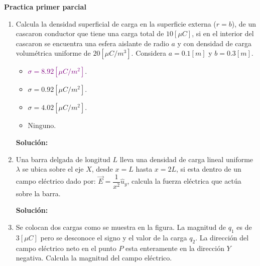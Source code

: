 \documentclass[letter,11pt]{article}
\begin{document}
\begin{center}
    {\Large \bf{Practica primer parcial}}
\end{center}

\noindent{}

\vspace{0.5cm}

\begin{enumerate}
\item Calcula la densidad superficial de carga en la superficie externa ($r=b$),
de un cascaron conductor que tiene una carga total de $10[\mu C]$, si en el
interior del cascaron se encuentra una esfera aislante de radio $a$ y con
densidad de carga volumétrica uniforme de $20[\mu C/m^3]$. Considera $a=0.1[m]$
y $b=0.3[m]$.

\begin{itemize}
    \item \textcolor{purple}{$\sigma = 8.92 [\mu C/m^2]$}.
    \item $\sigma = 0.92 [\mu C/m^2]$.
    \item $\sigma = 4.02 [\mu C/m^2]$.
    \item Ninguno.
\end{itemize}

\textbf{Solución:}


\item Una barra delgada de longitud $L$ lleva una densidad de carga lineal
uniforme $\lambda$ se ubica sobre el eje $X$, desde $x=L$ hasta $x=2L$, si esta
dentro de un campo eléctrico dado por: $\vec{E}=\dfrac{1}{x^2} \hat{u}_y$,
calcula la fuerza eléctrica que actúa sobre la barra.

\textbf{Solución:}

\item Se colocan dos cargas como se muestra en la figura. La magnitud de $q_1$
es de $3[\mu C]$ pero se desconoce el signo y el valor de la carga $q_2$. La
dirección del campo eléctrico neto en el punto $P$ esta enteramente en la
dirección $Y$ negativa. Calcula la magnitud del campo eléctrico.


\end{enumerate}
\end{document}

